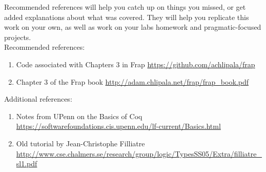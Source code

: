 \documentclass{article}
\begin{document}
Recommended references will help you catch up on things you missed, or get added explanations about what was covered. They will help you replicate this work on your own, as well as work on your labs homework and pragmatic-focused projects. \\

Recommended references:
\begin{enumerate}
    \item Code associated with Chapters 3 in Frap \href{https://github.com/achlipala/frap}{https://github.com/achlipala/frap}
    \item Chapter 3 of the Frap book \href{http://adam.chlipala.net/frap/frap\_book.pdf}{http://adam.chlipala.net/frap/frap\_book.pdf}
\end{enumerate}

Additional references:
\begin{enumerate}
    \item Notes from UPenn on the Basics of Coq \href{https://softwarefoundations.cis.upenn.edu/lf-current/Basics.html}{https://softwarefoundations.cis.upenn.edu/lf-current/Basics.html}
    \item Old tutorial by Jean-Christophe Filliatre\\ \href{http://www.cse.chalmers.se/research/group/logic/TypesSS05/Extra/filliatre\_sl1.pdf}{http://www.cse.chalmers.se/research/group/logic/TypesSS05/Extra/filliatre\_sl1.pdf} 
\end{enumerate}
\end{document}
